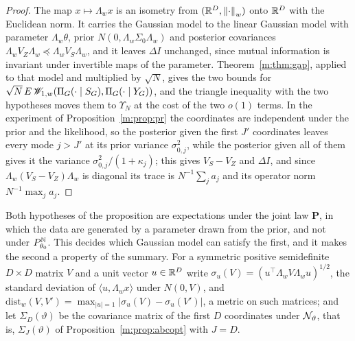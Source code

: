 \begin{proof}
The map $x\mapsto\Lambda_wx$ is an isometry from $(\mathbb{R}^D,\left\|\cdot\right\|_w)$ onto $\mathbb{R}^D$ with the Euclidean norm. It carries the Gaussian model to the linear Gaussian model with parameter $\Lambda_w\theta$, prior $N(0,\Lambda_w\Sigma_0\Lambda_w)$ and posterior covariances $\Lambda_wV_Z\Lambda_w\preceq\Lambda_wV_S\Lambda_w$, and it leaves $\Delta I$ unchanged, since mutual information is invariant under invertible maps of the parameter. Theorem~\ref{m:thm:gap}, applied to that model and multiplied by $\sqrt N$, gives the two bounds for $\sqrt N\,E\,\mathscr{W}_{1,w}(\Pi_G(\cdot\mid S_G),\Pi_G(\cdot\mid Y_G))$, and the triangle inequality with the two hypotheses moves them to $\Upsilon_N$ at the cost of the two $o(1)$ terms. In the experiment of Proposition~\ref{m:prop:pr} the coordinates are independent under the prior and the likelihood, so the posterior given the first $J'$ coordinates leaves every mode $j>J'$ at its prior variance $\sigma^2_{0,j}$, while the posterior given all of them gives it the variance $\sigma^2_{0,j}/(1+\kappa_j)$; this gives $V_S-V_Z$ and $\Delta I$, and since $\Lambda_w(V_S-V_Z)\Lambda_w$ is diagonal its trace is $N^{-1}\sum_ja_j$ and its operator norm $N^{-1}\max_ja_j$.
\end{proof}

Both hypotheses of the proposition are expectations under the joint law $\mathbf P$, in which the data are generated by a parameter drawn from the prior, and not under $P^{\mathbb{N}}_{\theta_0}$. This decides which Gaussian model can satisfy the first, and it makes the second a property of the summary. For a symmetric positive semidefinite $D\times D$ matrix $V$ and a unit vector $u\in\mathbb{R}^D$ write $\sigma_u(V)=(u^\top\Lambda_wV\Lambda_wu)^{1/2}$, the standard deviation of $\langle u,\Lambda_wx\rangle$ under $N(0,V)$, and $\mathrm{dist}_w(V,V')=\max_{|u|=1}|\sigma_u(V)-\sigma_u(V')|$, a metric on such matrices; and let $\Sigma_D(\vartheta)$ be the covariance matrix of the first $D$ coordinates under $\mathcal{N}_\vartheta$, that is, $\Sigma_J(\vartheta)$ of Proposition~\ref{m:prop:abcopt} with $J=D$.

